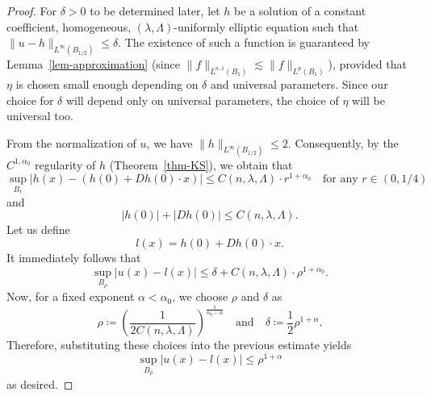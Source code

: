 \documentclass[11pt]{amsart}
\theoremstyle{plain}
\theoremstyle{definition}
\numberwithin{equation}{section}
\begin{document}
\begin{proof}
    For $\delta>0$ to be determined later, let $h$ be a solution of a constant coefficient, homogeneous, $(\lambda, \Lambda)$-uniformly elliptic equation such that $\|u - h\|_{L^\infty(B_{1/2})} \leq \delta$. The existence of such a function is guaranteed by Lemma~\ref{lem-approximation} (since $\|f\|_{L^{n, 1}(B_1)} \lesssim \|f\|_{L^p(B_1)}$), provided that $\eta$ is chosen small enough depending on $\delta$ and universal parameters. Since our choice for $\delta$ will depend only on universal parameters, the choice of $\eta$ will be universal too.

    From the normalization of $u$, we have $\|h\|_{L^{\infty}(B_{1/2})} \leq 2$. Consequently, by the $C^{1, \alpha_0}$ regularity of $h$ (Theorem~\ref{thm-KS}), we obtain that
    \begin{equation*}
        \sup_{B_r}|h(x)-(h(0)+Dh(0)\cdot x)| \leq C(n, \lambda, \Lambda) \cdot r^{1+\alpha_0} \quad \text{for any $r \in (0, 1/4)$}
    \end{equation*}
    and
    \begin{equation*}
        |h(0)|+|Dh(0)| \leq C(n, \lambda, \Lambda).
    \end{equation*}
    Let us define
    \begin{equation*}
        l(x)=h(0)+Dh(0) \cdot x.
    \end{equation*}
    It immediately follows that
    \begin{equation*}
        \sup_{B_{\rho}} |u(x)-l(x)| \leq \delta+C(n, \lambda, \Lambda) \cdot \rho^{1+\alpha_0}.
    \end{equation*}
    Now, for a fixed exponent $\alpha<\alpha_0$, we choose $\rho$ and $\delta$ as
    \begin{equation*}
        \rho \coloneqq \left(\frac{1}{2C(n, \lambda, \Lambda)} \right)^{\frac{1}{\alpha_0-\alpha}} \quad \text{and} \quad \delta \coloneqq \frac{1}{2}\rho^{1+\alpha}.
    \end{equation*}
    Therefore, substituting these choices into the previous estimate yields
    \begin{equation*}
        \sup_{B_{\rho}} |u(x)-l(x)| \leq \rho^{1+\alpha}
    \end{equation*}
    as desired.
\end{proof}
\end{document}
